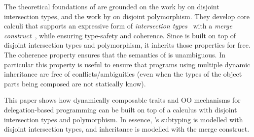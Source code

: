 The theoretical foundations of \name are grounded on the work by
\citet{oliveira2016disjoint} on disjoint intersection types, and the work by
\citet{alpuimdisjoint} on disjoint polymorphism. They develop core calculi that supports an
expressive form of \emph{intersection
  types}~\cite{coppo1981functional,pottinger1980type} with a \emph{merge
  construct}~\cite{dunfield2014elaborating}, while ensuring
type-safety and coherence. Since \name is built on top of disjoint
intersection types and polymorphism, it inherits those properties for
free. The coherence property ensures that the semantics of
\name is unambiguous. In particular this property is useful to ensure that
programs using multiple dynamic inheritance are free of conflicts/ambiguities
(even when the types of the object parts being composed are not statically
know).

This paper shows how dynamically composable traits 
and OO mechanisms for delegation-based programming can be built on top
of a calculus with disjoint intersection types and polymorphism.
In essence, \name's subtyping is modelled with
disjoint intersection types, and inheritance is modelled with the merge
construct.

\begin{comment}
However
\citeauthor{oliveira2016disjoint} and \citeauthor{alpuimdisjoint}
 do not show how to build high-level OOP constructs for
delegation-based programming, discuss the applications to extensible designs, or
provide a language implementation and conduct case studies to evaluate a
language design. What their work does is to develop core calculi that support an
expressive form of \emph{intersection
  types}~\cite{coppo1981functional,pottinger1980type} with a \emph{merge
  construct}~\cite{dunfield2014elaborating}. In \name subtyping is modelled with
disjoint intersection types, and inheritance is modelled with the merge
construct. \name inherits the key properties of these calculi, which are
type-safety and coherence. 
\end{comment}  


\begin{comment}
The
novelty of the work in this paper is a three-fold. Firstly we show how
to develop and implement a statically typed, delegation-based OOP
source language on top of core language constructs provided by
disjoint intersection types. Secondly we illustrate the applications
of those high-level constructs to solve issues that show up in
extensibility designs. Finally, we provide a case study on
modularization of language components.
\end{comment}

